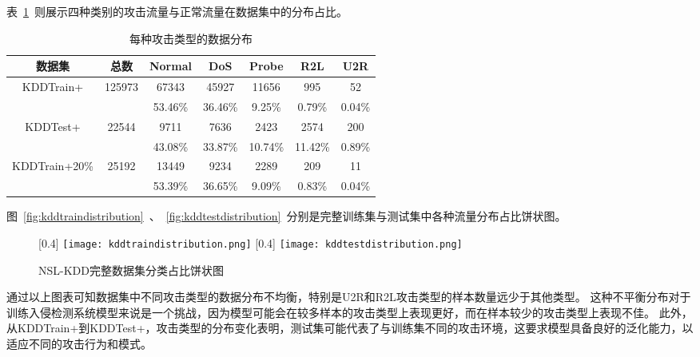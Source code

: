 表~\ref{tab:kdd_distribution}~则展示四种类别的攻击流量与正常流量在数据集中的分布占比。
\begin{table}[h]
	\caption{每种攻击类型的数据分布}
	\label{tab:kdd_distribution}
	\centering
	\begin{tabular}{ccccccc}
		\toprule
		\textbf{数据集}                & \textbf{总数}           & \textbf{Normal} & \textbf{DoS} & \textbf{Probe} & \textbf{R2L} & \textbf{U2R} \\
		\midrule
		\multirow{2}{*}{KDDTrain+}     & \multirow{2}{*}{125973} & 67343           & 45927        & 11656          & 995          & 52           \\
		                               &                         & 53.46\%         & 36.46\%      & 9.25\%         & 0.79\%       & 0.04\%       \\
		\multirow{2}{*}{KDDTest+}      & \multirow{2}{*}{22544}  & 9711            & 7636         & 2423           & 2574         & 200          \\
		                               &                         & 43.08\%         & 33.87\%      & 10.74\%        & 11.42\%      & 0.89\%       \\
		\multirow{2}{*}{KDDTrain+20\%} & \multirow{2}{*}{25192}  & 13449           & 9234         & 2289           & 209          & 11           \\
		                               &                         & 53.39\%         & 36.65\%      & 9.09\%         & 0.83\%       & 0.04\%       \\
		\bottomrule
	\end{tabular}
\end{table}

图~\ref{fig:kddtraindistribution}~、~\ref{fig:kddtestdistribution}~分别是完整训练集与测试集中各种流量分布占比饼状图。
\begin{figure}[htbp]
	\centering
	[0.4\textwidth]{
		\texttt{[image: kddtraindistribution.png]}
	}
	\hspace{36pt}
	[0.4\textwidth]{
		\texttt{[image: kddtestdistribution.png]}
	}
	\caption{NSL-KDD完整数据集分类占比饼状图}
\end{figure}

通过以上图表可知数据集中不同攻击类型的数据分布不均衡，特别是U2R和R2L攻击类型的样本数量远少于其他类型。
这种不平衡分布对于训练入侵检测系统模型来说是一个挑战，因为模型可能会在较多样本的攻击类型上表现更好，而在样本较少的攻击类型上表现不佳。
此外，从KDDTrain+到KDDTest+，攻击类型的分布变化表明，测试集可能代表了与训练集不同的攻击环境，这要求模型具备良好的泛化能力，以适应不同的攻击行为和模式。\par

